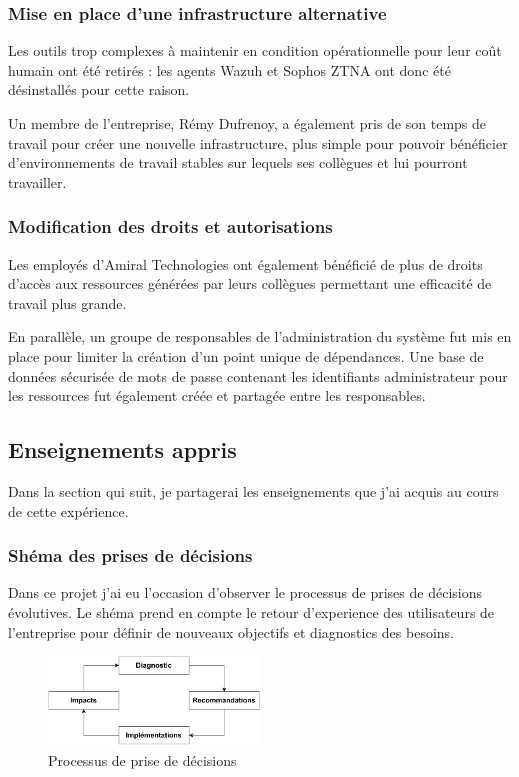 \subsubsection{Mise en place d'une infrastructure alternative}
Les outils trop complexes à maintenir en condition opérationnelle pour leur coût humain ont été retirés : les agents Wazuh et Sophos ZTNA ont donc été désinstallés pour cette raison.

Un membre de l'entreprise, Rémy Dufrenoy, a également pris de son temps de travail pour créer une nouvelle infrastructure, plus simple pour pouvoir bénéficier d'environnements de travail stables sur lequels ses collègues et lui pourront travailler.

\subsubsection{Modification des droits et autorisations}
Les employés d'Amiral Technologies ont également bénéficié de plus de droits d'accès aux ressources générées par leurs collègues permettant une efficacité de travail plus grande.

En parallèle, un groupe de responsables de l'administration du système fut mis en place pour limiter la création d'un point unique de dépendances.
Une base de données sécurisée de mots de passe contenant les identifiants administrateur pour les ressources fut également créée et partagée entre les responsables.

\subsection{Enseignements appris}
Dans la section qui suit, je partagerai les enseignements que j'ai acquis au cours de cette expérience.

\subsubsection{Shéma des prises de décisions}
Dans ce projet j'ai eu l'occasion d'observer le processus de prises de décisions évolutives.
Le shéma prend en compte le retour d'experience des utilisateurs de l'entreprise pour définir de nouveaux objectifs et diagnostics des besoins.

\begin{figure}[ht!]
    \centering
    \includegraphics[width=0.5\textwidth]{paper/figures/boucle.pdf}
    \caption{Processus de prise de décisions}
    \label{fig:boucle}
\end{figure}


